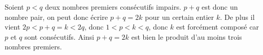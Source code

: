 Soient $p<q$ deux nombres premiers consécutifs impairs. $p+q$ est donc un nombre pair, on peut donc écrire $p+q=2k$ pour un certain entier $k$. De plus il vient $2p<p+q=k<2q$, donc $1<p<k<q$, donc $k$ est forcément composé car $p$ et $q$ sont consécutifs. Ainsi $p+q=2k$ est bien le produit d'au moins trois nombres premiers.